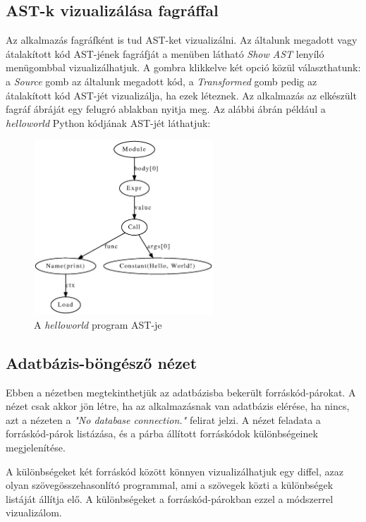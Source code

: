 \subsection{AST-k vizualizálása fagráffal}

Az alkalmazás fagráfként is tud AST-ket vizualizálni.
Az általunk megadott vagy átalakított kód AST-jének fagráfját a menüben látható
\emph{Show AST} lenyíló menügombbal vizualizálhatjuk.
A gombra klikkelve két opció közül választhatunk:
a \emph{Source} gomb az általunk megadott kód, a \emph{Transformed} gomb pedig az átalakított kód
AST-jét vizualizálja, ha ezek léteznek.
Az alkalmazás az elkészült fagráf ábráját egy felugró ablakban nyitja meg.
Az alábbi ábrán például a \emph{helloworld} Python kódjának AST-jét láthatjuk:

\begin{figure}[H]
	\centering
	\includegraphics[width=0.6\textwidth]{images/figs/ast_graph.eps}
	\caption{A \emph{helloworld} program AST-je}
\end{figure}

\subsection{Adatbázis-böngésző nézet}

Ebben a nézetben megtekinthetjük az adatbázisba bekerült forráskód-párokat.
A nézet csak akkor jön létre, ha az alkalmazásnak van adatbázis elérése,
ha nincs, azt a nézeten a \emph{"No database connection."} felirat jelzi.
A nézet feladata a forráskód-párok listázása, és a párba állított forráskódok
különbségeinek megjelenítése.

A különbségeket két forráskód között könnyen vizualizálhatjuk egy diffel,
azaz olyan szövegösszehasonlító programmal, ami a szövegek közti a különbségek
listáját állítja elő.
A különbségeket a forráskód-párokban ezzel a módszerrel vizualizálom.

